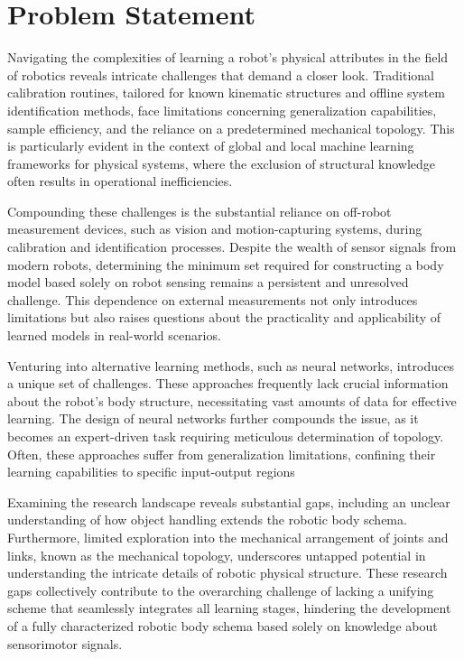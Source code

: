 \section{Problem Statement}
Navigating the complexities of learning a robot's physical attributes in the field of robotics reveals intricate challenges that demand a closer look. Traditional calibration routines, tailored for known kinematic structures and offline system identification methods, face limitations concerning generalization capabilities, sample efficiency, and the reliance on a predetermined mechanical topology. This is particularly evident in the context of global and local machine learning frameworks for physical systems, where the exclusion of structural knowledge often results in operational inefficiencies. 

Compounding these challenges is the substantial reliance on off-robot measurement devices, such as vision and motion-capturing systems, during calibration and identification processes. Despite the wealth of sensor signals from modern robots, determining the minimum set required for constructing a body model based solely on robot sensing remains a persistent and unresolved challenge. This dependence on external measurements not only introduces limitations but also raises questions about the practicality and applicability of learned models in real-world scenarios.

Venturing into alternative learning methods, such as neural networks, introduces a unique set of challenges. These approaches frequently lack crucial information about the robot's body structure, necessitating vast amounts of data for effective learning. The design of neural networks further compounds the issue, as it becomes an expert-driven task requiring meticulous determination of topology. Often, these approaches suffer from generalization limitations, confining their learning capabilities to specific input-output regions

Examining the research landscape reveals substantial gaps, including an unclear understanding of how object handling extends the robotic body schema. Furthermore, limited exploration into the mechanical arrangement of joints and links, known as the mechanical topology, underscores untapped potential in understanding the intricate details of robotic physical structure. These research gaps collectively contribute to the overarching challenge of lacking a unifying scheme that seamlessly integrates all learning stages, hindering the development of a fully characterized robotic body schema based solely on knowledge about sensorimotor signals.

